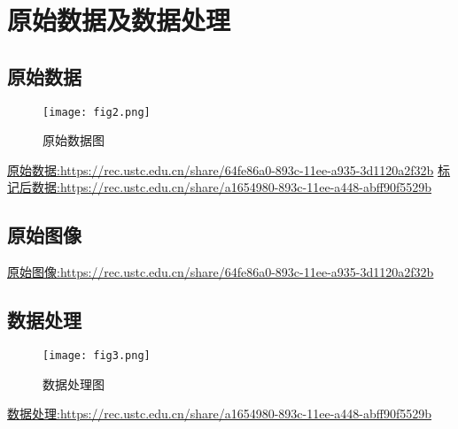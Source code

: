 
\chapter{原始数据及数据处理}


\section{原始数据}
\begin{figure}[h]
    \centering
    \texttt{[image: fig2.png]}
    \caption{原始数据图}
    \label{fig2}
\end{figure}
\href{https://rec.ustc.edu.cn/share/64fe86a0-893c-11ee-a935-3d1120a2f32b}{原始数据:https://rec.ustc.edu.cn/share/64fe86a0-893c-11ee-a935-3d1120a2f32b}
\href{https://rec.ustc.edu.cn/share/a1654980-893c-11ee-a448-abff90f5529b}{标记后数据:https://rec.ustc.edu.cn/share/a1654980-893c-11ee-a448-abff90f5529b}

\section{原始图像}
\begin{figure}[htbp]
    \begin{floatrow}[3]
    \end{floatrow}
\end{figure}
\begin{figure}[htbp]
    \begin{floatrow}[3]
    \end{floatrow}
\end{figure}
\begin{figure}[htbp]
    \begin{floatrow}[3]
    \end{floatrow}
\end{figure}
\href{https://rec.ustc.edu.cn/share/64fe86a0-893c-11ee-a935-3d1120a2f32b}{原始图像:https://rec.ustc.edu.cn/share/64fe86a0-893c-11ee-a935-3d1120a2f32b}

\section{数据处理}
\begin{figure}[h]
    \centering
    \texttt{[image: fig3.png]}
    \caption{数据处理图}
    \label{fig3}
\end{figure}
\href{https://rec.ustc.edu.cn/share/a1654980-893c-11ee-a448-abff90f5529b}{数据处理:https://rec.ustc.edu.cn/share/a1654980-893c-11ee-a448-abff90f5529b}